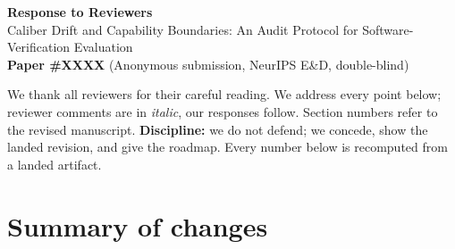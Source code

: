 \documentclass[11pt]{article}
\begin{document}
\begin{center}
{\Large\bfseries Response to Reviewers}\\[2pt]
{\large Caliber Drift and Capability Boundaries: An Audit Protocol for Software-Verification Evaluation}\\[2pt]
\textbf{Paper \#XXXX} \quad (Anonymous submission, NeurIPS E\&D, double-blind)
\end{center}

\noindent
We thank all reviewers for their careful reading. We address every point below; reviewer comments
are in \emph{italic}, our responses follow. Section numbers refer to the revised manuscript.
\textbf{Discipline:} we do not defend; we concede, show the landed revision, and give the roadmap.
Every number below is recomputed from a landed artifact.

\section*{Summary of changes}
\end{document}
